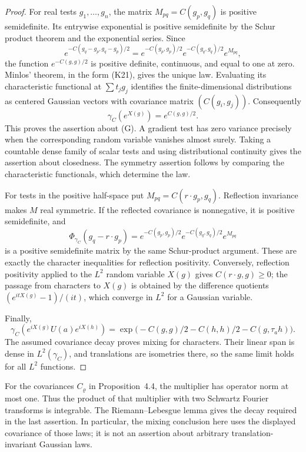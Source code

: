 \documentclass[11pt,letterpaper,reqno]{amsart}
\theoremstyle{definition}
\begin{document}
\begin{proof}
For real tests $g_1,\ldots,g_n$, the matrix
$M_{pq}=C(g_p,g_q)$ is positive semidefinite. Its entrywise exponential
is positive semidefinite by the Schur product theorem and the
exponential series. Since
\[
 e^{-C(g_q-g_p,g_q-g_p)/2}
 =e^{-C(g_p,g_p)/2}e^{-C(g_q,g_q)/2}e^{M_{pq}},
\]
the function $e^{-C(g,g)/2}$ is positive definite, continuous, and
equal to one at zero. Minlos' theorem, in the form (K21), gives the
unique law. Evaluating its characteristic functional at
$\sum t_jg_j$ identifies the finite-dimensional distributions as
centered Gaussian vectors with covariance matrix $(C(g_i,g_j))$.
Consequently
\[
 \gamma_C(e^{X(g)})=e^{C(g,g)/2}.
\]
This proves the assertion about (G). A gradient test has zero
variance precisely when the corresponding random variable vanishes
almost surely. Taking a countable dense family of scalar tests and
using distributional continuity gives the assertion about closedness.
The symmetry assertion follows by comparing the characteristic
functionals, which determine the law.

For tests in the positive half-space put
$M_{pq}=C(r\cdot g_p,g_q)$. Reflection invariance makes $M$ real
symmetric. If the reflected covariance is nonnegative, it is positive
semidefinite, and
\[
 \Phi_{\gamma_C}(g_q-r\cdot g_p)
 =e^{-C(g_p,g_p)/2}e^{-C(g_q,g_q)/2}e^{M_{pq}}
\]
is a positive semidefinite matrix by the same Schur-product argument.
These are exactly the character inequalities for reflection
positivity. Conversely, reflection positivity applied to the
$L^2$ random variable $X(g)$ gives $C(r\cdot g,g)\ge0$; the passage
from characters to $X(g)$ is obtained by the difference quotients
$(e^{itX(g)}-1)/(it)$, which converge in $L^2$ for a Gaussian variable.

Finally,
\[
 \gamma_C(e^{iX(g)}U(a)e^{iX(h)})
 =\exp\bigl(-C(g,g)/2-C(h,h)/2-C(g,\tau_a h)\bigr).
\]
The assumed covariance decay proves mixing for characters. Their
linear span is dense in $L^2(\gamma_C)$, and translations are
isometries there, so the same limit holds for all $L^2$ functions.
\end{proof}

For the covariances $C_\varrho$ in Proposition~4.4, the multiplier
has operator norm at most one. Thus the product of that multiplier
with two Schwartz Fourier transforms is integrable. The
Riemann--Lebesgue lemma gives the decay required in the last assertion.
In particular, the mixing conclusion here uses the displayed
covariance of those laws; it is not an assertion about arbitrary
translation-invariant Gaussian laws.
\end{document}

